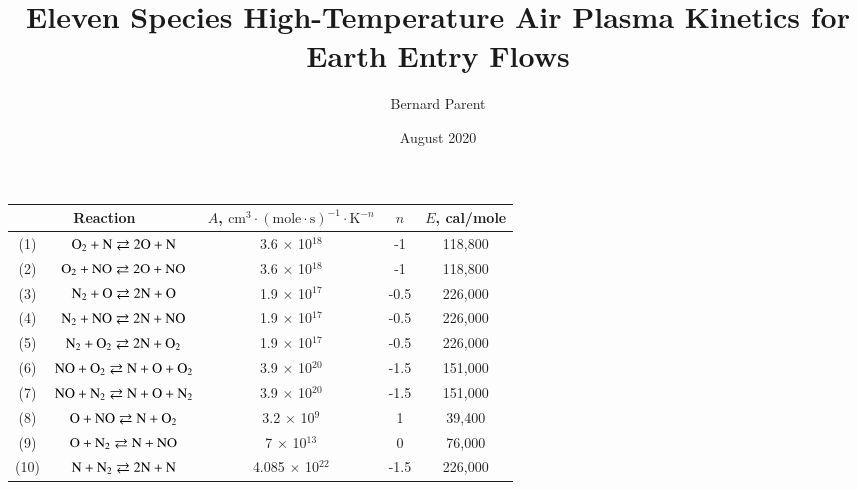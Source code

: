 \documentclass{warpdoc}
\author{
  Bernard Parent 
}
\title{Eleven Species High-Temperature Air Plasma Kinetics for Earth Entry Flows
}
\date{
  August 2020
}
\renewcommand{\fontsizetable}{\footnotesize\scalefont{0.9}}
\begin{document}
  \pagestyle{headings}
  \setcounter{page}{1}
  \makewarpdoctitle









%
\begin{table}[t]
\fontsizetable
\begin{center}
\begin{threeparttable}
\begin{tabular}{ccccc} 
\toprule
\multicolumn{2}{c}{Reaction} & $A$, $\textrm{cm}^3\cdot(\textrm{mole}\cdot \textrm{s})^{-1}\cdot \textrm{K}^{-n}$ & $n$ & $E$, cal/mole  \\ 
\midrule
(1) & $\rm O_2 + N \rightleftarrows 2O+N$ & 3.6 $\times$ 10$^{18}$  & -1 & 118,800 \\
(2) & $\rm O_2 + NO \rightleftarrows 2O+NO$ & 3.6 $\times$ 10$^{18}$ & -1 & 118,800 \\
(3) & $\rm N_2 + O \rightleftarrows 2N+O$ & 1.9 $\times$ 10$^{17}$ & -0.5 & 226,000 \\
(4) & $\rm N_2 + NO \rightleftarrows 2N+NO$ & 1.9 $\times$ 10$^{17}$ & -0.5 & 226,000 \\
(5) & $\rm N_2 + O_2 \rightleftarrows 2N+O_2$ & 1.9 $\times$ 10$^{17}$ & -0.5 & 226,000 \\
(6) & $\rm NO + O_2 \rightleftarrows N+O+O_2$ & 3.9 $\times$ 10$^{20}$ & -1.5 & 151,000 \\
(7) & $\rm NO + N_2 \rightleftarrows N+O+N_2$ & 3.9 $\times$ 10$^{20}$ & -1.5 & 151,000 \\
(8) & $\rm O + NO \rightleftarrows N+O_2$ & 3.2 $\times$ 10$^{9}$ & 1 & 39,400 \\
(9) & $\rm O + N_2 \rightleftarrows N+NO$ & 7 $\times$ 10$^{13}$ & 0 & 76,000 \\
(10) & $\rm N + N_2 \rightleftarrows 2N+N$ & 4.085 $\times$ 10$^{22}$ & -1.5 & 226,000 \\

\end{tabular}
\end{threeparttable}
\end{center}
\end{table}
\end{document}
